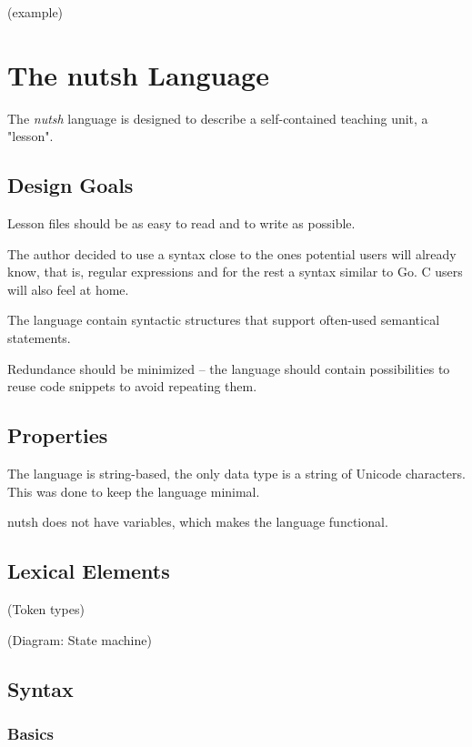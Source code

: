 \documentclass[twoside]{scrreprt}
\begin{document}

(example)

\chapter{The nutsh Language}

The \emph{nutsh} language is designed to describe a self-contained teaching unit, a "lesson".

\section{Design Goals}

Lesson files should be as easy to read and to write as possible.

The author decided to use a syntax close to the ones potential users will already know, that is, regular expressions and for the rest a syntax similar to Go. C users will also feel at home.

The language contain syntactic structures that support often-used semantical statements.

Redundance should be minimized -- the language should contain possibilities to reuse code snippets to avoid repeating them.

\section{Properties}

The language is string-based, the only data type is a string of Unicode characters. This was done to keep the language minimal.

nutsh does not have variables, which makes the language functional.

\section{Lexical Elements}

(Token types)

(Diagram: State machine)

\section{Syntax}

\subsection{Basics}
\end{document}
